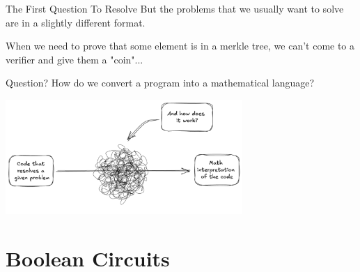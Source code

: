 \documentclass{zkdl-presentation-template}
\begin{document}
    \begin{frame}{The First Question To Resolve}
        But the problems that we usually want to solve are in a slightly different format.
        

        \vspace{0.1cm}
        When we need to prove that some element is in a merkle tree, we can't come
        to a verifier and give them a "coin"...
        
        
        \begin{alertblock}{Question?}
            How do we convert a program into a mathematical language?
        \end{alertblock}

        \center
        \includegraphics[width=9cm]{../presentations/images/lecture_8/exactcodetomathflow.png}
    \end{frame}

    \section{Boolean Circuits}
\end{document}
